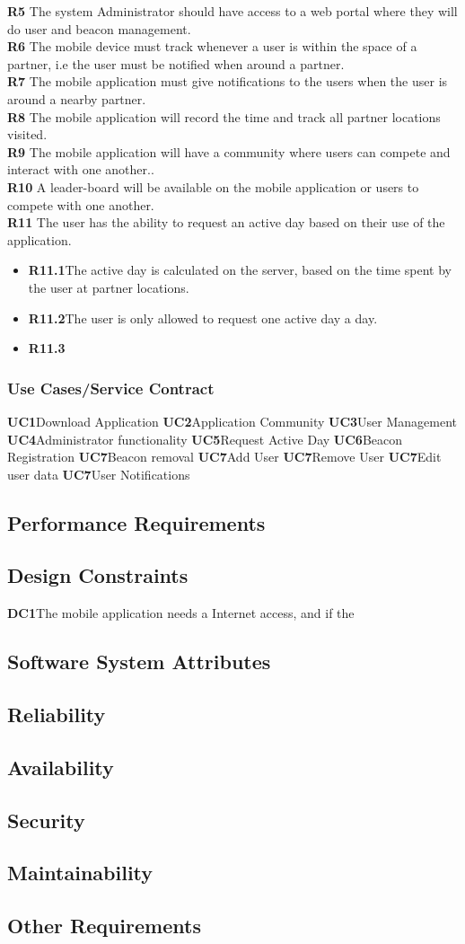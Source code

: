 \documentclass[11pt]{article}
\begin{document}
\textbf{R5} The system Administrator should have access to a web portal where they will do user and beacon management. \\
\textbf{R6} The mobile device must track whenever a user is within the space of a partner, i.e the user must be notified when around a partner. \\
\textbf{R7} The mobile application must give notifications to the users when the user is around a nearby partner. \\
\textbf{R8} The mobile application will record the time and track all partner locations visited. \\
\textbf{R9} The mobile application will have a community where users can compete and interact with one another..\\
\textbf{R10} A leader-board will be available on the mobile application or users to compete with one another.  \\
\textbf{R11} The user has the ability to request an active day based on their use of the application.
\begin{itemize}	
	\item \textbf{R11.1}The active day is calculated on the server, based on the time spent by the user at partner locations.
	\item \textbf{R11.2}The user is only allowed to request one active day a day. 	
	\item \textbf{R11.3} 
\end{itemize}
\subsubsection{Use Cases/Service Contract}
\textbf{UC1}Download Application
\textbf{UC2}Application Community
\textbf{UC3}User Management
\textbf{UC4}Administrator functionality
\textbf{UC5}Request Active Day
\textbf{UC6}Beacon Registration
\textbf{UC7}Beacon removal
\textbf{UC7}Add User
\textbf{UC7}Remove User
\textbf{UC7}Edit user data
\textbf{UC7}User Notifications

\subsection{Performance Requirements}
\subsection{Design Constraints}
\textbf{DC1}The mobile application needs a Internet access, and if the 
\subsection{Software System Attributes}
\subsection{Reliability}
\subsection{Availability}
\subsection{Security}
\subsection{Maintainability}
\subsection{Other Requirements}
\end{document}
